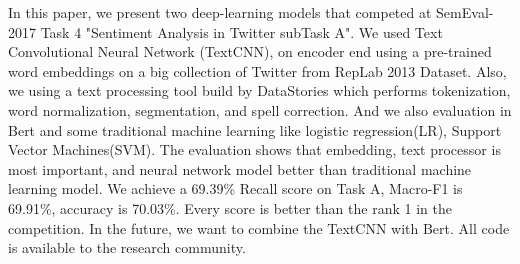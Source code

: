 In this paper, we present two deep-learning models that competed at SemEval-2017 Task 4 "Sentiment Analysis in Twitter subTask A". We used Text Convolutional Neural Network (TextCNN), on encoder end using a pre-trained word embeddings on a big collection of Twitter from RepLab 2013 Dataset. Also, we using a text processing tool build by DataStories which performs tokenization, word normalization, segmentation, and spell correction. And we also evaluation in Bert and some traditional machine learning like logistic regression(LR), Support Vector Machines(SVM). The evaluation shows that embedding, text processor is most important, and neural network model better than traditional machine learning model. We achieve a 69.39\% Recall score on Task A,  Macro-F1 is 69.91\%, accuracy is 70.03\%. Every score is better than the rank 1 in the competition. In the future, we want to combine the TextCNN with Bert.  All code is available to the research community.